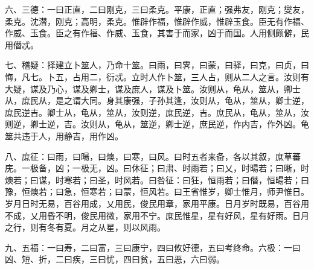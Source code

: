 六、三德：一曰正直，二曰刚克，三曰柔克。平康，正直；强弗友，刚克；燮友，柔克。沈潜，刚克；高明，柔克。惟辟作福，惟辟作威，惟辟玉食。臣无有作福、作威、玉食。臣之有作福、作威、玉食，其害于而家，凶于而国。人用侧颇僻，民用僭忒。

七、稽疑：择建立卜筮人，乃命十筮。曰雨，曰霁，曰蒙，曰驿，曰克，曰贞，曰悔，凡七。卜五，占用二，衍忒。立时人作卜筮，三人占，则从二人之言。汝则有大疑，谋及乃心，谋及卿士，谋及庶人，谋及卜筮。汝则从，龟从，筮从，卿士从，庶民从，是之谓大同。身其康强，子孙其逢，汝则从，龟从，筮从，卿士逆，庶民逆吉。卿士从，龟从，筮从，汝则逆，庶民逆，吉。庶民从，龟从，筮从，汝则逆，卿士逆，吉。汝则从，龟从，筮逆，卿士逆，庶民逆，作内吉，作外凶。龟筮共违于人，用静吉，用作凶。

八、庶征：曰雨，曰暘，曰燠，曰寒，曰风。曰时五者来备，各以其叙，庶草蕃庑。一极备，凶；一极无，凶。曰休征；曰肃、时雨若；曰乂，时暘若；曰晰，时燠若；曰谋，时寒若；曰圣，时风若。曰咎征：曰狂，恒雨若；曰僭，恒暘若；曰豫，恒燠若；曰急，恒寒若；曰蒙，恒风若。曰王省惟岁，卿士惟月，师尹惟日。岁月日时无易，百谷用成，乂用民，俊民用章，家用平康。日月岁时既易，百谷用不成，乂用昏不明，俊民用微，家用不宁。庶民惟星，星有好风，星有好雨。日月之行，则有冬有夏。月之从星，则以风雨。

九、五福：一曰寿，二曰富，三曰康宁，四曰攸好德，五曰考终命。六极：一曰凶、短、折，二曰疾，三曰忧，四曰贫，五曰恶，六曰弱。
